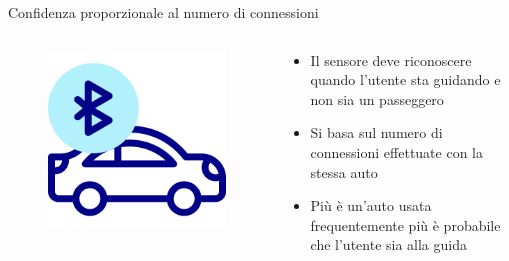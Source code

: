 \documentclass{beamer}
\begin{document}
\begin{frame}{Confidenza proporzionale al numero di connessioni}
\begin{columns}
    \begin{column}{0.3\textwidth}
        \begin{figure}
            \centering
            \includegraphics[width=\linewidth]{assets/car-bluetooth.png}
        \end{figure}
    \end{column}
    \begin{column}{0.6\textwidth}
        \begin{itemize}
            \item Il sensore deve riconoscere quando l'utente sta guidando e non sia un passeggero
            \item Si basa sul numero di connessioni effettuate con la stessa auto
            \item Più è un'auto usata frequentemente più è probabile che l'utente sia alla guida
        \end{itemize}
    \end{column}
\end{columns}
\end{frame}
\end{document}
